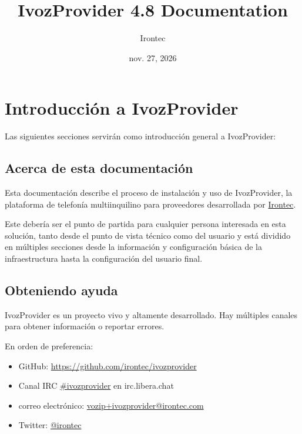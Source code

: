 \documentclass[letterpaper,10pt,spanish]{sphinxmanual}
\title{IvozProvider 4.8 Documentation}
\date{nov. 27, 2026}
\author{Irontec}
\begin{document}
\maketitle
\tableofcontents
{}\label{index::doc}



\chapter{Introducción a IvozProvider}
\label{basic_concepts/intro/index::doc}\label{basic_concepts/intro/index:introduction-to-ivozprovider}\label{basic_concepts/intro/index:ivozprovider-official-documentation}
Las siguientes secciones servirán como introducción general a IvozProvider:


\section{Acerca de esta documentación}
\label{basic_concepts/intro/about::doc}\label{basic_concepts/intro/about:about-this-documentation}
Esta documentación describe el proceso de instalación y uso de IvozProvider, la plataforma de telefonía multiinquilino para proveedores desarrollada por \href{http://irontec.com}{Irontec}.

Este debería ser el punto de partida para cualquier persona interesada en esta solución, tanto desde el punto de vista técnico como del usuario y está dividido en múltiples secciones desde la información y configuración básica de la infraestructura hasta la configuración del usuario final.


\section{Obteniendo ayuda}
\label{basic_concepts/intro/getting_help:getting-help}\label{basic_concepts/intro/getting_help::doc}\label{basic_concepts/intro/getting_help:id1}
IvozProvider es un proyecto vivo y altamente desarrollado. Hay múltiples canales para obtener información o reportar errores.

En orden de preferencia:
\begin{itemize}
\item {} 
GitHub: \url{https://github.com/irontec/ivozprovider}

\item {} 
Canal IRC \href{https://kiwiirc.com/nextclient/irc.libera.chat/\#ivozprovider}{\#ivozprovider} en irc.libera.chat

\item {} 
correo electrónico: \href{mailto:vozip+ivozprovider@irontec.com}{vozip+ivozprovider@irontec.com}

\item {} 
Twitter: \href{https://twitter.com/irontec}{@irontec}

\end{itemize}
\end{document}
